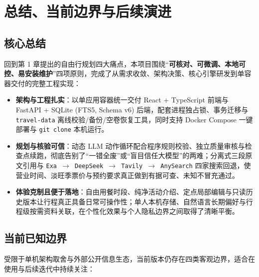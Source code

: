 \section{总结、当前边界与后续演进}

\subsection{核心总结}

回到第 1 章提出的自由行规划四大痛点，本项目围绕“\textbf{可核对、可微调、本地可控、易安装维护}”四项原则，完成了从需求收敛、架构决策、核心引擎研发到单容器交付的完整工程实现：

\begin{itemize}
  \item \textbf{架构与工程扎实}：以单应用容器统一交付 React + TypeScript 前端与 FastAPI + SQLite (FTS5, Schema v6) 后端，配套进程独占锁、事务迁移与 \texttt{travel-data} 离线校验/备份/空卷恢复工具，同时支持 Docker Compose 一键部署与 \texttt{git clone} 本机运行。
  \item \textbf{规划与核验可信}：动态 LLM 动作循环配合程序规则校验、独立质量审核与检查点续跑，彻底告别了“一错全废”或“盲目信任大模型”的两难；分离式三段原文引用与 \texttt{Exa $\rightarrow$ DeepSeek $\rightarrow$ Tavily $\rightarrow$ AnySearch} 四家搜索回退，使营业时间、淡旺季票价与预约要求真正做到有据可查、未知不冒充通过。
  \item \textbf{体验克制且便于落地}：自由用餐时段、纯净活动介绍、定点局部编辑与只读历史版本让行程真正具备日常可操作性；单人本机存储、自然语言长期偏好与行程级按需资料关联，在个性化效果与个人隐私边界之间取得了清晰平衡。
\end{itemize}

\subsection{当前已知边界}

受限于单机架构取舍与外部公开信息生态，当前版本仍存在四类客观边界，适合在使用与后续迭代中持续关注：

